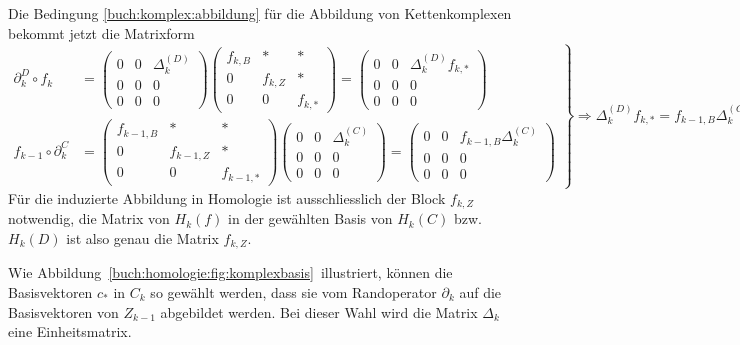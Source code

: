 Die Bedingung \eqref{buch:komplex:abbildung} für die Abbildung von Kettenkomplexen
bekommt jetzt die Matrixform
\begin{equation}
\left.
\begin{aligned}
\partial_k^{D}\circ f_k
&=
\begin{pmatrix}
0&0&\Delta_k^{(D)}\\
0&0&0\\
0&0&0
\end{pmatrix}
\begin{pmatrix}
f_{k,B} &    *    & * \\
   0    & f_{k,Z} & * \\
   0    &    0    & f_{k,*}
\end{pmatrix}
=
\begin{pmatrix}
0&0&\Delta_k^{(D)}f_{k,*}\\
0&0&0\\
0&0&0
\end{pmatrix}
\\
f_{k-1}\circ \partial_k^C
&=
\begin{pmatrix}
f_{k-1,B}&   *   &   *   \\
   0   &f_{k-1,Z}&   *   \\
   0   &   0   &f_{k-1,*}
\end{pmatrix}
\begin{pmatrix}
0&0&\Delta_k^{(C)}\\
0&0&0\\
0&0&0
\end{pmatrix}
=
\begin{pmatrix}
0&0&f_{k-1,B}\Delta_k^{(C)}\\
0&0&0\\
0&0&0
\end{pmatrix}
\end{aligned}
\right\}
\Rightarrow
\Delta_k^{(D)}f_{k,*}
=
f_{k-1,B}\Delta_k^{(C)}.
\label{buch:homologie:matrixform}
\end{equation}
Für die induzierte Abbildung in Homologie ist ausschliesslich der
Block $f_{k,Z}$ notwendig, die Matrix von $H_k(f)$ in der gewählten
Basis von $H_k(C)$ bzw.~$H_k(D)$ ist also genau die Matrix $f_{k,Z}$.


Wie Abbildung~\ref{buch:homologie:fig:komplexbasis} illustriert, können die
Basisvektoren $c_*$ in $C_k$ so gewählt werden, dass sie vom Randoperator
$\partial_k$ auf die Basisvektoren von $Z_{k-1}$ abgebildet werden.
Bei dieser Wahl wird die Matrix $\Delta_k$ eine Einheitsmatrix.

